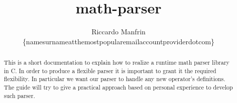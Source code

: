\documentclass[a4paper,10pt, twocolumn]{article}
\title{math-parser}
\author{Riccardo Manfrin \\ \{namesurnameatthemostpopularemailaccountproviderdotcom\}}
\begin{document}
\maketitle
\begin{abstract}
This is a short documentation to explain how to realize a runtime math parser library in C.
In order to produce a flexible parser it is important to grant it the required flexibility. In particular we want our parser to handle any new operator's definitions.
The guide will try to give a practical approach based on personal experience to develop such parser.
\end{abstract}


\end{document}
